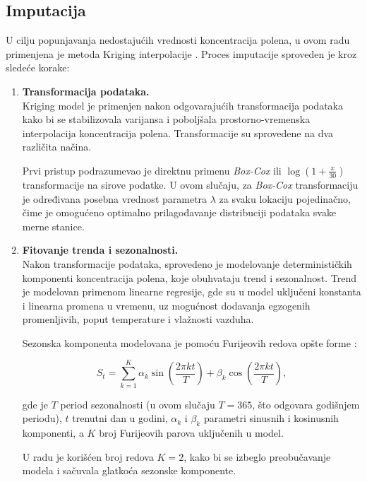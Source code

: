\documentclass[12pt]{article}
\begin{document}
\subsection{Imputacija}

U cilju popunjavanja nedostajućih vrednosti koncentracija polena, u ovom radu primenjena je metoda Kriging interpolacije \cite{cressie1993statistics, chiles2009geostatistics}. Proces imputacije sproveden je kroz sledeće korake:

\begin{enumerate}
    \item \textbf{Transformacija podataka.} \\
    Kriging model je primenjen nakon odgovarajućih transformacija podataka kako bi se stabilizovala varijansa i poboljšala prostorno-vremenska interpolacija koncentracija polena. Transformacije su sprovedene na dva različita načina.

    Prvi pristup podrazumevao je direktnu primenu \textit{Box-Cox} ili $\log(1 + \frac{x}{30})$ transformacije na sirove podatke. U ovom slučaju, za \textit{Box-Cox} transformaciju je određivana posebna vrednost parametra $\lambda$ za svaku lokaciju pojedinačno, čime je omogućeno optimalno prilagođavanje distribuciji podataka svake merne stanice.

    \item \textbf{Fitovanje trenda i sezonalnosti.} \\
    Nakon transformacije podataka, sprovedeno je modelovanje determinističkih komponenti koncentracija polena, koje obuhvataju trend i sezonalnost. Trend je modelovan primenom linearne regresije, gde su u model uključeni konstanta  i linearna promena u vremenu, uz mogućnost dodavanja egzogenih promenljivih, poput temperature i vlažnosti vazduha.

    Sezonska komponenta modelovana je pomoću Furijeovih redova opšte forme \cite{hyndman2018forecasting}:

    \[
    S_t = \sum_{k=1}^{K} \alpha_k \sin\left( \frac{2 \pi k t}{T} \right)
    + \beta_k \cos\left( \frac{2 \pi k t}{T} \right),
    \]

    gde je $T$ period sezonalnosti (u ovom slučaju $T=365$, što odgovara godišnjem periodu), $t$ trenutni dan u godini, $\alpha_k$ i $\beta_k$ parametri sinusnih i kosinusnih komponenti, a $K$ broj Furijeovih parova uključenih u model.

    U radu je korišćen broj redova $K=2$, kako bi se izbeglo preobučavanje modela i sačuvala glatkoća sezonske komponente.


\end{enumerate}
\end{document}

